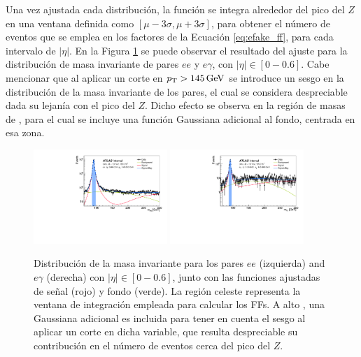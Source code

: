 Una vez ajustada cada distribución, la función se integra alrededor del pico del $Z$ en una ventana definida como $[\mu - 3\sigma, \mu + 3\sigma]$, para obtener el número de eventos que se emplea en los factores de la Ecuación \ref{eq:efake_ff}, para cada intervalo de $|\eta|$. En la Figura \ref{fig:efakes_fit} se puede observar el resultado del ajuste para la distribución de masa invariante de pares $ee$ y $e\gamma$, con $|\eta| \in [0-0.6]$. 
Cabe mencionar que al aplicar un corte en $p_{\text{T}}>145\,\text{GeV}$ se introduce un sesgo en la distribución de la masa invariante de los pares, el cual se considera despreciable dada su lejanía con el pico del $Z$. Dicho efecto se observa en la región de masas de , para el cual se incluye una función Gaussiana adicional al fondo, centrada en esa zona.


\begin{figure}[ht!]
  \centering
  \includegraphics[width=0.45\textwidth]{images/analysis/egFF_fit_ee_eta_0_06.pdf}
  \includegraphics[width=0.45\textwidth]{images/analysis/egFF_fit_eg_eta_0_06.pdf}
  \caption{Distribución de la masa invariante para los pares $ee$ (izquierda) and $e\gamma$ (derecha) con $|\eta| \in [0-0.6]$, junto con las funciones ajustadas de señal (rojo) y fondo (verde). La región celeste representa la ventana de integración empleada para calcular los FFs. A alto \pt, una Gaussiana adicional es incluida para tener en cuenta el sesgo al aplicar un corte en dicha variable, que resulta despreciable su contribución en el número de eventos cerca del pico del $Z$.}
  \label{fig:efakes_fit}
\end{figure}


